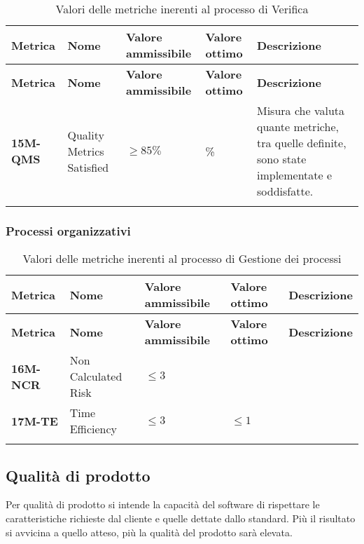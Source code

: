 \begin{longtable}{|>{\centering\arraybackslash}p{}|>{\centering\arraybackslash}p{}|>{\centering\arraybackslash}p{}|>{\centering\arraybackslash}p{}|>{\centering\arraybackslash}p{}|}
    \hline
    \textbf{Metrica} & \textbf{Nome} & \textbf{Valore ammissibile} & \textbf{Valore ottimo}& \textbf{Descrizione}\\
	\hline
    \endfirsthead
    \hline
    \textbf{Metrica} & \textbf{Nome} & \textbf{Valore ammissibile} & \textbf{Valore ottimo}& \textbf{Descrizione}\\
    \endhead
	\textbf{15M-QMS} & Quality Metrics Satisfied & $\geq 85\% $ & 100\% & Misura che valuta quante metriche, tra quelle definite, sono state implementate e soddisfatte.\\
	\hline
	\caption{ Valori delle metriche inerenti al processo di Verifica}
	\label{table:5}
\end{longtable}
\subsubsection{Processi organizzativi}
\begin{longtable}{|>{\centering\arraybackslash}p{}|>{\centering\arraybackslash}p{}|>{\centering\arraybackslash}p{}|>{\centering\arraybackslash}p{}|>{\centering\arraybackslash}p{}|}
    \hline
    \textbf{Metrica} & \textbf{Nome} & \textbf{Valore ammissibile} & \textbf{Valore ottimo}& \textbf{Descrizione}\\
	\hline
    \endfirsthead
    \hline
    \textbf{Metrica} & \textbf{Nome} & \textbf{Valore ammissibile} & \textbf{Valore ottimo}& \textbf{Descrizione}\\
    \endhead
	\hline
	\textbf{16M-NCR} & Non Calculated Risk & $\leq 3 $ & 0 &\\
	\hline
	\textbf{17M-TE} & Time Efficiency & $\leq 3 $ & $\leq 1 $ &\\
	\hline

	\caption{ Valori delle metriche inerenti al processo di Gestione dei processi}
	\label{table:6}
\end{longtable}
\subsection{Qualità di prodotto}
Per qualità di prodotto si intende la capacità del software di rispettare 
le caratteristiche richieste dal cliente e quelle dettate dallo standard.
Più il risultato si avvicina a quello atteso, più la qualità del prodotto
sarà elevata. 
